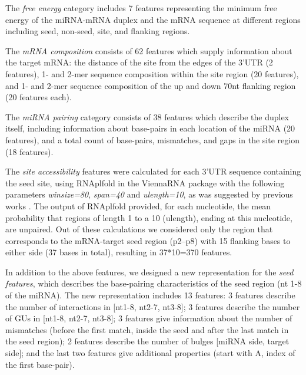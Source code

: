 \documentclass{bmcart}
\begin{document}
The \textit{free energy} category includes 7 features representing the minimum free energy of the miRNA-mRNA duplex and the mRNA sequence at different regions including seed, non-seed, site, and flanking regions. 

The \textit{mRNA composition} consists of 62 features which supply information about the target mRNA: the distance of the site from the edges of the 3'UTR (2 features), 1- and 2-mer sequence composition within the site region (20 features), and 1- and 2-mer sequence composition of the up and down 70nt flanking region (20 features each). 

The \textit{miRNA pairing} category consists of 38 features which describe the duplex itself, including information about base-pairs in each location of the miRNA (20 features), and a total count of base-pairs, mismatches, and gaps in the site region (18 features).

The \textit{site accessibility} features were calculated for each 3'UTR sequence containing the seed site, using RNAplfold in the ViennaRNA package \cite{lorenz2011viennarna} with the following parameters \textit{winsize=80}, \textit{span=40} and \textit{ulength=10}, as was suggested by previous works \cite{menor2014mirmark, wen2018deepmirtar}. The output of RNAplfold provided, for each nucleotide, the mean probability that regions of length 1 to a 10 (ulength), ending at this nucleotide, are unpaired. Out of these calculations we considered only the region that corresponds to the mRNA-target seed region (p2–p8) with 15 flanking bases to either side (37 bases in total), resulting in 37*10=370 features.

In addition to the above features, we designed a new representation for the \textit{seed features}, which describes the base-pairing characteristics of the seed region (nt 1-8 of the miRNA). The new representation includes 13 features: 3 features describe the number of interactions in [nt1-8, nt2-7, nt3-8]; 3 features describe the number of GUs in [nt1-8, nt2-7, nt3-8]; 3 features give information about the number of mismatches (before the first match, inside the seed and after the last match in the seed region); 2 features describe the number of bulges [miRNA side, target side]; and the last two features give additional properties (start with A, index of the first base-pair).
\end{document}
